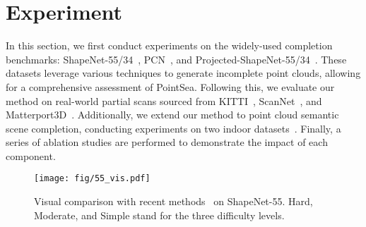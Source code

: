 \section{Experiment}
In this section, we first conduct experiments on the widely-used completion benchmarks: ShapeNet-55/34~\citep{10232862}, PCN~\citep{yuan2018pcn}, and Projected-ShapeNet-55/34~\citep{10232862}. 
These datasets leverage various techniques to generate incomplete point clouds, allowing for a comprehensive assessment of PointSea.
Following this, we evaluate our method on real-world partial scans sourced from KITTI~\citep{geiger2013vision}, ScanNet~\citep{dai2017scannet}, and Matterport3D~\citep{matterport3d}.
Additionally, we extend our method to point cloud semantic scene completion, conducting experiments on two indoor datasets~\citep{xu2023casfusionnet}.
Finally, a series of ablation studies are performed to demonstrate the impact of each component.
\begin{figure*}[t]
  \centering
  \texttt{[image: fig/55\_vis.pdf]}
\caption{Visual comparison with recent methods~\citep{yu2021pointr,chen2023anchorformer,10232862,Zhu_2023_ICCV} on ShapeNet-55. Hard,  Moderate, and Simple stand for the three difficulty levels.}
  \label{fig:vis55}
\end{figure*}

